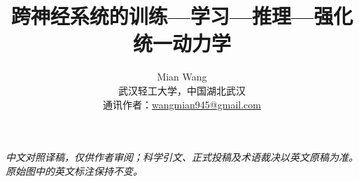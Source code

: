 \documentclass[UTF8,fontset=fandol,12pt,a4paper]{ctexart}
\title{\bfseries 跨神经系统的训练—学习—推理—强化统一动力学}
\author{Mian Wang\\{\small 武汉轻工大学，中国湖北武汉}\\
{\small 通讯作者：\href{mailto:wangmian945@gmail.com}{wangmian945@gmail.com}}}
\date{}
\begin{document}
\pagestyle{plain} %
\maketitle
\begin{center}
{\small\itshape 中文对照译稿，仅供作者审阅；科学引文、正式投稿及术语裁决以英文原稿为准。原始图中的英文标注保持不变。}
\end{center}



\end{document}
